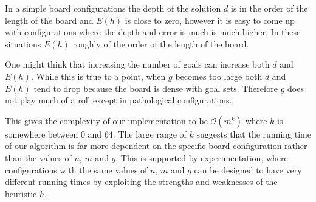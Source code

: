 \documentclass[11pt]{article}
\theoremstyle{definition}
\begin{document}
    In a simple board configurations the depth of the solution $d$ is in the order of the length of the board and $E(h)$ is close to zero, however it is easy to come up with configurations where the depth and error is much is much higher. In these situations $E(h)$ roughly of the order of the length of the board. 
    
    One might think that increasing the number of goals can increase both $d$ and $E(h)$. While this is true to a point, when $g$ becomes too large both $d$ and $E(h)$ tend to drop because the board is dense with goal sets. Therefore $g$ does not play much of a roll except in pathological configurations. 

    This gives the complexity of our implementation to be $\mathcal{O}(m^k)$ where $k$ is somewhere between $0$ and $64$. The large range of $k$ suggests that the running time of our algorithm is far more dependent on the specific board configuration rather than the values of $n$, $m$ and $g$. This is supported by experimentation, where configurations with the same values of $n$, $m$ and $g$ can be designed to have very different running times by exploiting the strengths and weaknesses of the heuristic $h$.
\end{document}
